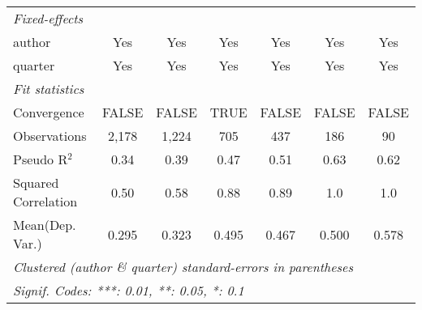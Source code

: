 \begin{tabular}{lcccccc}
   \midrule
   \emph{Fixed-effects}\\
   author                                                     & Yes           & Yes           & Yes        & Yes           & Yes                      & Yes\\  
   quarter                                                    & Yes           & Yes           & Yes        & Yes           & Yes                      & Yes\\  
   \midrule
   \emph{Fit statistics}\\
   Convergence                                                &FALSE          & FALSE         & TRUE       & FALSE         & FALSE                    & FALSE\\  
   Observations                                               & 2,178         & 1,224         & 705        & 437           & 186                      & 90\\  
   Pseudo R$^2$                                               & 0.34          & 0.39          & 0.47       & 0.51          & 0.63                     & 0.62\\  
   Squared Correlation                                        & 0.50          & 0.58          & 0.88       & 0.89          & 1.0                      & 1.0\\  
Mean(Dep. Var.) & 0.295 & 0.323 & 0.495 & 0.467 & 0.500 & 0.578 \\
   \midrule \midrule
   \multicolumn{7}{l}{\emph{Clustered (author \& quarter) standard-errors in parentheses}}\\
   \multicolumn{7}{l}{\emph{Signif. Codes: ***: 0.01, **: 0.05, *: 0.1}}\\
\end{tabular}
\par\endgroup
